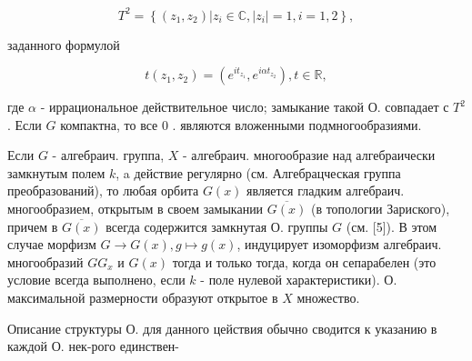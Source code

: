 \documentclass[10pt]{article}
\begin{document}
\[

T^{2}=\left\{\left(z_{1}, z_{2}\right)\left|z_{i} \in \mathbb{C},\right| z_{i} \mid=1, i=1,2\right\},

\]



заданного формулой



\[

t\left(z_{1}, z_{2}\right)=\left(e^{i t_{z_{1}}}, e^{i \alpha t_{z_{2}}}\right), t \in \mathbb{R},

\]



где $\alpha$ - иррациональное действительное число; замыкание такой $О$. совпадает с $T^{2}$. Если $G$ компактна, то все 0 . являются вложенными подмногообразиями.



Если $G$ - алгебраич. группа, $X$ - алгебраич. многообразие над алгебраически замкнутым полем $k$, a действие регулярно (см. Алгебрацческая группа преобразований), то любая орбита $G(x)$ является гладким алгебраич. многообразием, открытым в своем замыкании $\overline{G(x)}$ (в топологии Зариского), причем в $\overline{G(x)}$ всегда содержится замкнутая О. группы $G$ (см. [5]). В этом случае морфизм $G \rightarrow G(x), g \mapsto g(x)$, индуцирует изоморфизм алгебраич. многообразий $G G_{x}$ и $G(x)$ тогда и только тогда, когда он сепарабелен (это условие всегда выполнено, если $k$ - поле нулевой характеристики). О. максимальной размерности образуют открытое в $X$ множество.



Описание структуры О. для данного цействия обычно сводится к указанию в каждой О. нек-рого единствен-
\end{document}
